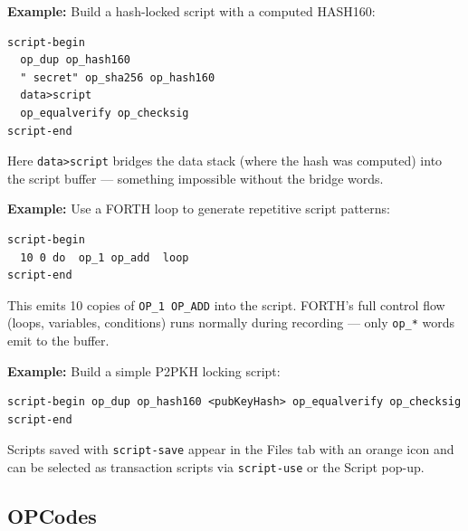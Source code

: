 \documentclass[a4paper, 11pt, openany]{book}
\begin{document}
\begin{notebox}
\textbf{Example:} Build a hash-locked script with a computed HASH160:
\begin{lstlisting}
script-begin
  op_dup op_hash160
  " secret" op_sha256 op_hash160
  data>script
  op_equalverify op_checksig
script-end
\end{lstlisting}
Here \texttt{data>script} bridges the data stack (where the hash was computed) into the script buffer --- something impossible without the bridge words.
\end{notebox}

\begin{notebox}
\textbf{Example:} Use a FORTH loop to generate repetitive script patterns:
\begin{lstlisting}
script-begin
  10 0 do  op_1 op_add  loop
script-end
\end{lstlisting}
This emits 10 copies of \texttt{OP\_1 OP\_ADD} into the script. FORTH's full control flow (loops, variables, conditions) runs normally during recording --- only \texttt{op\_*} words emit to the buffer.
\end{notebox}

\begin{notebox}
\textbf{Example:} Build a simple P2PKH locking script:
\begin{lstlisting}
script-begin op_dup op_hash160 <pubKeyHash> op_equalverify op_checksig script-end
\end{lstlisting}
Scripts saved with \texttt{script-save} appear in the Files tab with an orange icon and can be selected as transaction scripts via \texttt{script-use} or the Script pop-up.
\end{notebox}

\newpage
\subsection{OPCodes}
\end{document}
